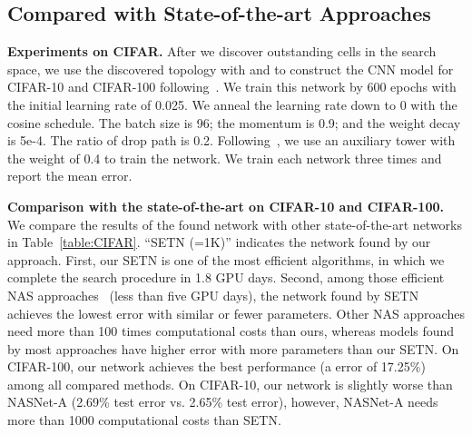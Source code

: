 \documentclass[10pt,twocolumn,letterpaper]{article}
\def\Tabref#1{Table~\ref{#1}}
\def\NAME{{SETN}}
\begin{document}
\subsection{Compared with State-of-the-art Approaches}\label{sec:comparison}

{\bf Experiments on CIFAR.}
After we discover outstanding cells in the search space, we use the discovered topology with  and  to construct the CNN model for CIFAR-10 and CIFAR-100 following~\cite{liu2019darts,luo2018neural}.
We train this network by 600 epochs with the initial learning rate of 0.025.
We anneal the learning rate down to 0 with the cosine schedule.
The batch size is 96; the momentum is 0.9; and the weight decay is 5e-4.
The ratio of drop path is 0.2. Following~\cite{Liu_2018_ECCV,zoph2017NAS,Zoph_2018_CVPR,liu2019darts,dong2019search}, we use an auxiliary tower with the weight of 0.4 to train the network. We train each network three times and report the mean error.

{\bf Comparison with the state-of-the-art on CIFAR-10 and CIFAR-100.}
We compare the results of the found network with other state-of-the-art networks in \Tabref{table:CIFAR}.
``{\NAME} (=1K)'' indicates the network found by our approach.
First, our {\NAME} is one of the most efficient algorithms, in which we complete the search procedure in 1.8 GPU days.
Second, among those efficient NAS approaches~\cite{zhang2019graph,pmlr-v80-pham18a,liu2019darts} (less than five GPU days), the network found by {\NAME} achieves the lowest error with similar or fewer parameters.
Other NAS approaches need more than 100 times computational costs than ours, whereas models found by most approaches have higher error with more parameters than our {\NAME}.
On CIFAR-100, our network achieves the best performance (a error of 17.25\%) among all compared methods.
On CIFAR-10, our network is slightly worse than NASNet-A (2.69\% test error vs. 2.65\% test error), however, NASNet-A needs more than 1000 computational costs than {\NAME}.
\end{document}
